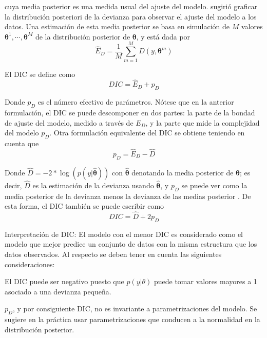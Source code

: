 \documentclass[
  spanish,
  letter]{book}
\theoremstyle{definition}
\theoremstyle{definition}
\theoremstyle{definition}
\theoremstyle{remark}
\begin{document}
cuya media posterior es una medida usual del ajuste del modelo.  sugirió graficar la distribución posteriori de la devianza para observar el ajuste del modelo a los datos. Una estimación de esta media posterior se basa en simulación de \(M\) valores \(\boldsymbol \theta^1,\cdots,\boldsymbol \theta^M\) de la distribución posterior de \(\boldsymbol \theta\), y está dada por
\begin{equation*}
\hat{E}_D=\frac{1}{M}\sum_{m=1}^MD(y,\boldsymbol \theta^m)
\end{equation*}

El DIC se define como
\begin{equation*}
DIC=\hat{E}_D+p_D
\end{equation*}

Donde \(p_D\) es el número efectivo de parámetros. Nótese que en la anterior formulación, el DIC se puede descomponer en dos partes: la parte de la bondad de ajuste del modelo, medido a través de \(E_D\), y la parte que mide la complejidad del modelo \(p_D\). Otra formulación equivalente del DIC se obtiene teniendo en cuenta que
\begin{equation*}
p_D=\hat{E}_D - \hat{D}
\end{equation*}

Donde \(\hat{D}=-2*\log(p(y|\hat{\boldsymbol \theta}))\) con \(\hat{\boldsymbol \theta}\) denotando la media posterior de \(\boldsymbol \theta\); es decir, \(\hat{D}\) es la estimación de la devianza usando \(\hat{\boldsymbol \theta}\), y \(p_D\) se puede ver como la media posterior de la devianza menos la devianza de las medias posterior \cite{Spiegel}. De esta forma, el DIC también se puede escribir como
\begin{equation*}
DIC=\hat{D}+2p_D
\end{equation*}

Interpretación de DIC: El modelo con el menor DIC es considerado como el modelo que mejor predice un conjunto de datos con la misma estructura que los datos observados. Al respecto se deben tener en cuenta las siguientes consideraciones:

\item

El DIC puede ser negativo puesto que \(p(y|\theta)\) puede tomar valores mayores a 1 asociado a una devianza pequeña.

\item

\(p_D\), y por consiguiente DIC, no es invariante a parametrizaciones del modelo. Se sugiere en la práctica usar parametrizaciones que conducen a la normalidad en la distribución posterior.
\end{document}
